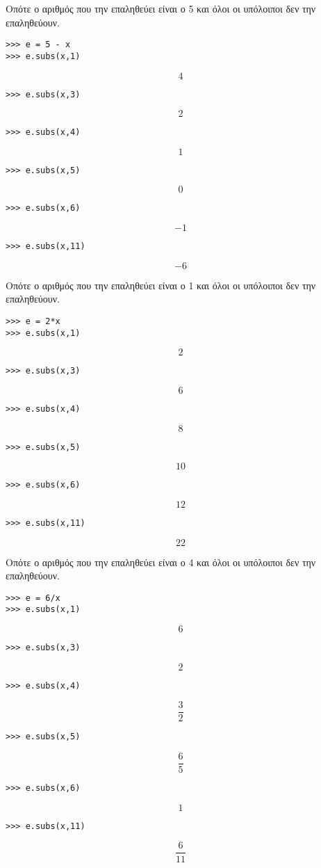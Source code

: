 Οπότε ο αριθμός που την επαληθεύει είναι ο 5 και όλοι οι υπόλοιποι δεν την επαληθεύουν.

\begin{lstlisting}
>>> e = 5 - x
>>> e.subs(x,1)
\end{lstlisting}
$$4$$
\begin{lstlisting}
>>> e.subs(x,3)
\end{lstlisting}
$$2$$
\begin{lstlisting}
>>> e.subs(x,4)
\end{lstlisting}
$$1$$
\begin{lstlisting}
>>> e.subs(x,5)
\end{lstlisting}
$$0$$
\begin{lstlisting}
>>> e.subs(x,6)
\end{lstlisting}
$$-1$$
\begin{lstlisting}
>>> e.subs(x,11)
\end{lstlisting}
$$-6$$

Οπότε ο αριθμός που την επαληθεύει είναι ο 1 και όλοι οι υπόλοιποι δεν την επαληθεύουν.

\begin{lstlisting}
>>> e = 2*x
>>> e.subs(x,1)
\end{lstlisting}
$$2$$
\begin{lstlisting}
>>> e.subs(x,3)
\end{lstlisting}
$$6$$
\begin{lstlisting}
>>> e.subs(x,4)
\end{lstlisting}
$$8$$
\begin{lstlisting}
>>> e.subs(x,5)
\end{lstlisting}
$$10$$
\begin{lstlisting}
>>> e.subs(x,6)
\end{lstlisting}
$$12$$
\begin{lstlisting}
>>> e.subs(x,11)
\end{lstlisting}
$$22$$

Οπότε ο αριθμός που την επαληθεύει είναι ο 4 και όλοι οι υπόλοιποι δεν την επαληθεύουν.

\begin{lstlisting}
>>> e = 6/x
>>> e.subs(x,1)
\end{lstlisting}
$$6$$
\begin{lstlisting}
>>> e.subs(x,3)
\end{lstlisting}
$$2$$
\begin{lstlisting}
>>> e.subs(x,4)
\end{lstlisting}
$$\frac{3}{2}$$
\begin{lstlisting}
>>> e.subs(x,5)
\end{lstlisting}
$$\frac{6}{5}$$
\begin{lstlisting}
>>> e.subs(x,6)
\end{lstlisting}
$$1$$
\begin{lstlisting}
>>> e.subs(x,11)
\end{lstlisting}
$$\frac{6}{11}$$


